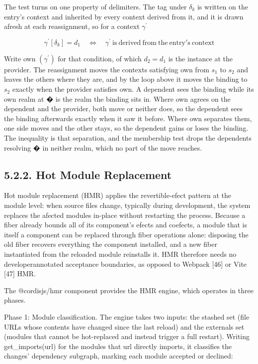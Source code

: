 \documentclass[
  10
]{article}
\begin{document}
The test turns on one property of delimiters. The tag under
\(\delta _ { k }\) is written on the entry's context and inherited by
every context derived from it, and it is drawn afresh at each
reassignment, so for a context \(\gamma ^ { \prime }\)

\[
\gamma ^ { \prime } [ \delta _ { k } ] = d _ { 1 } \quad \Longleftrightarrow \quad \gamma ^ { \prime } { \mathrm { ~ i s ~ d e r i v e d ~ f r o m ~ t h e ~ e n t r y ' s ~ c o n t e x t } }\tag{65}
\]

Write own \(( \gamma ^ { \prime } )\) for that condition, of which
\(d _ { 2 } = d _ { 1 }\) is the instance at the provider. The
reassignment moves the contexts satisfying own from \(s _ { 1 }\) to
\(s _ { 2 }\) and leaves the others where they are, and by the loop
above it moves the binding to \(s _ { 2 }\) exactly when the provider
satisfies own. A dependent sees the binding while its own realm at � is
the realm the binding sits in. Where own agrees on the dependent and the
provider, both move or neither does, so the dependent sees the binding
afterwards exactly when it saw it before. Where own separates them, one
side moves and the other stays, so the dependent gains or loses the
binding. The inequality is that separation, and the membership test
drops the dependents resolving � in neither realm, which no part of the
move reaches.

\subsection{5.2.2. Hot Module Replacement}\label{hot-module-replacement}

Hot module replacement (HMR) applies the revertible-efect pattern at the
module level: when source files change, typically during development,
the system replaces the afected modules in-place without restarting the
process. Because a fiber already bounds all of its component's efects
and coefects, a module that is itself a component can be replaced
through fiber operations alone: disposing the old fiber recovers
everything the component installed, and a new fiber instantiated from
the reloaded module reinstalls it. HMR therefore needs no
developerannotated acceptance boundaries, as opposed to Webpack {[}46{]}
or Vite {[}47{]} HMR.

The @cordisjs/hmr component provides the HMR engine, which operates in
three phases.

Phase 1: Module classification. The engine takes two inputs: the stashed
set (file URLs whose contents have changed since the last reload) and
the externals set (modules that cannot be hot-replaced and instead
trigger a full restart). Writing get\_imports(url) for the modules that
url directly imports, it classifies the changes' dependency subgraph,
marking each module accepted or declined:
\end{document}
